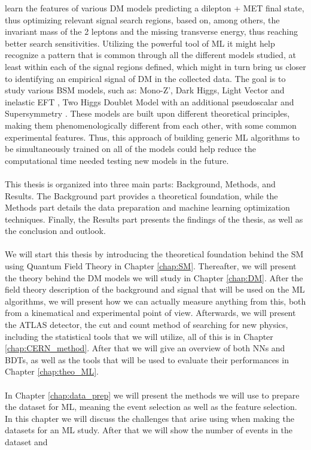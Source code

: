 \documentclass[12pt, a4paper]{book}
\begin{document}
learn the features of various DM models predicting a dilepton + MET final state, thus optimizing relevant signal search regions, based on, among others, the invariant mass of the 2 leptons and the missing transverse energy, thus reaching better search sensitivities. 
Utilizing the powerful tool of ML it might help recognize a pattern that is common through all the different models studied, at least within each of the signal regions defined, which might in turn bring us closer to identifying an empirical signal of DM in the collected data. 
The goal is to study various BSM models, such as: Mono-Z', Dark Higgs, Light Vector and inelastic EFT \cite{Zp_DM_candidate2}, Two Higgs Doublet Model with an additional pseudoscalar \cite{article} and Supersymmetry \cite{JUNGMAN1996195}. 
These models are built upon different theoretical principles, making them phenomenologically different from each other, with some common experimental features. Thus, this approach of building generic ML algorithms to be simultaneously trained on all of the models 
could help reduce the computational time needed testing new models in the future.\\
\\This thesis is organized into three main parts: Background, Methods, and Results. The Background part provides a theoretical foundation, while the Methods part details the data preparation and machine learning optimization techniques. 
Finally, the Results part presents the findings of the thesis, as well as the conclusion and outlook.\\
\\We will start this thesis by introducing the theoretical foundation behind the SM using Quantum Field Theory in Chapter \ref{chap:SM}. Thereafter, we will present the theory behind the DM models we will study in Chapter \ref{chap:DM}. After the field theory description of the background and signal that will be used 
on the ML algorithms, we will present how we can actually measure anything from this, both from a kinematical and experimental point of view. Afterwards, we will present the ATLAS detector, the cut and count method of searching for new physics, including the statistical 
tools that we will utilize, all of this is in Chapter \ref{chap:CERN_method}. After that we will give an overview of both NNs and BDTs, as well as the tools that will be used to evaluate their performances in Chapter \ref{chap:theo_ML}.\\
\\In Chapter \ref{chap:data_prep} we will present the methods we will use to prepare the dataset for ML, meaning the event selection as well as the feature selection. In this chapter we will discuss the challenges that arise using when making the datasets for an ML study. After that we will show the number of events in the dataset and 
\end{document}
